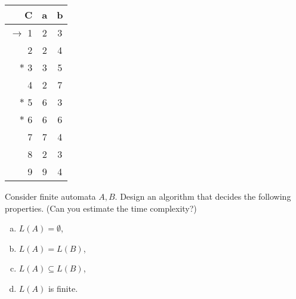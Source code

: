 \documentclass[a4paper,12pt]{amsart}
\begin{document}
\begin{problem}
\begin{multicols}{3}
        \begin{tabular}{ r | c c }
            C & a & b \\ \hline
            $\to$ 1 & 2 & 3 \\
            2 & 2 & 4 \\
            $\ast$ 3 & 3 & 5 \\
            4 & 2 & 7 \\
            $\ast$ 5 & 6 & 3 \\
            $\ast$ 6 & 6 & 6 \\
            7 & 7 & 4 \\
            8 & 2 & 3 \\
            9 & 9 & 4
        \end{tabular}

    \end{multicols}

\end{problem}


\vspace{-12pt}
\medskip\begin{problem}

    Consider finite automata $A,B$. Design an algorithm that decides the following properties. (Can you estimate the time complexity?)

    \medskip
    
    \begin{multicols}{2}
    
        \begin{enumerate}[(a)]\setlength\itemsep{12pt}
            \item $L(A)=\emptyset$,
            \item $L(A)=L(B)$,
            \item $L(A)\subseteq L(B)$,
            \item $L(A)$ is finite.
        \end{enumerate}

    \end{multicols}

\end{problem}
\end{document}

